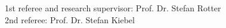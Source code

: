 \newpage
\thispagestyle{empty} 

\vspace*{\fill} 

\noindent
{\Large 1st referee and research supervisor: Prof. Dr. Stefan Rotter\\[0.5cm]
2nd referee: Prof. Dr. Stefan Kiebel\par}